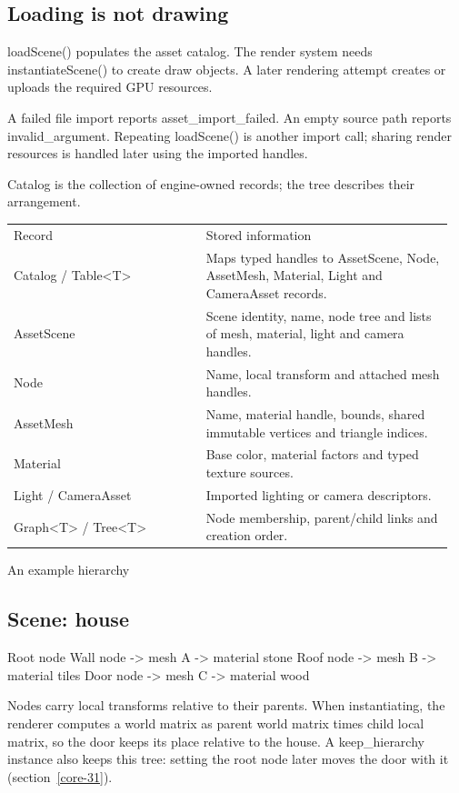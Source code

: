 \documentclass[11pt,a4paper]{article}
\begin{document}
\subsection*{Loading is not drawing}
loadScene() populates the asset catalog. The render system needs instantiateScene() to create draw objects. A later rendering attempt creates or uploads the required GPU resources.

A failed file import reports asset\_import\_failed. An empty source path reports invalid\_argument. Repeating loadScene() is another import call; sharing render resources is handled later using the imported handles.

\label{core-30}
Catalog is the collection of engine-owned records; the tree describes their arrangement.

{\small
\begin{longtable}{@{}p{0.42\linewidth}p{0.54\linewidth}@{}}
Record & Stored information \\
Catalog / Table<T> & Maps typed handles to AssetScene, Node, AssetMesh, Material, Light and CameraAsset records. \\
AssetScene & Scene identity, name, node tree and lists of mesh, material, light and camera handles. \\
Node & Name, local transform and attached mesh handles. \\
AssetMesh & Name, material handle, bounds, shared immutable vertices and triangle indices. \\
Material & Base color, material factors and typed texture sources. \\
Light / CameraAsset & Imported lighting or camera descriptors. \\
Graph<T> / Tree<T> & Node membership, parent/child links and creation order. \\
\end{longtable}
}

An example hierarchy

\subsection*{Scene: house}
Root node Wall node             -> mesh A -> material stone Roof node             -> mesh B -> material tiles Door node             -> mesh C -> material wood

Nodes carry local transforms relative to their parents. When instantiating, the renderer computes a world matrix as parent world matrix times child local matrix, so the door keeps its place relative to the house. A keep\_hierarchy instance also keeps this tree: setting the root node later moves the door with it (section~\ref{core-31}).
\end{document}
